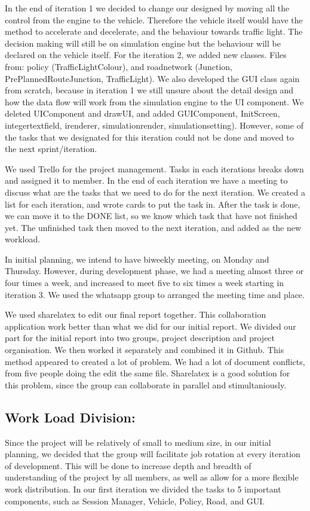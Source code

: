 \documentclass[11pt]{article}
\begin{document}
In the end of iteration 1 we decided to change our designed by moving all the control from the engine to the vehicle. Therefore the vehicle itself would have the method to accelerate and decelerate, and the behaviour towards traffic light. The decision making will still be on simulation engine but the behaviour will be declared on the vehicle itself. 
For the iteration 2, we added new classes. Files from: policy (TrafficLightColour), and roadnetwork (Junction, PrePlannedRouteJunction, TrafficLight). We also developed the GUI class again from scratch, because in iteration 1 we still unsure about the detail design and how the data flow will work from the simulation engine to the UI component. We deleted UIComponent and drawUI, and added GUIComponent, InitScreen, integertextfield, irenderer, simulationrender, simulationsetting). However, some of the tasks that we designated for this iteration could not be done and moved to the next sprint/iteration.  

We used Trello for the project management. Tasks in each iterations breaks down and assigned it to member. In the end of each iteration we have a meeting to discuss what are the tasks that we need to do for the next iteration. We created a list for each iteration, and wrote cards to put the task in. After the task is done, we can move it to the DONE list, so we know which task that have not finished yet. The unfinished task then moved to the next iteration, and added as the new workload.

In initial planning, we intend to have biweekly meeting, on Monday and Thursday. However, during development phase, we had a meeting almost three or four times a week, and increased to meet five to six times a week starting in iteration 3. We used the whatsapp group to arranged the meeting time and place. 

We used sharelatex to edit our final report together. This collaboration application work better than what we did for our initial report. We divided our part for the initial report into two groups, project description and project organisation. We then worked it separately and combined it in Github. This method appeared to created a lot of problem. We had a lot of document conflicts, from five people doing the edit the same file. Sharelatex is a good solution for this problem, since the group can collaborate in parallel and stimultaniously. 

\subsection{Work Load Division:}
Since the project will be relatively of small to medium size, in our initial planning, we decided that the group will facilitate job rotation at every iteration of development. This will be done to increase depth and breadth of understanding of the project by all members, as well as allow for a more flexible work distribution. In our first iteration we divided the tasks to 5 important components, such as Session Manager, Vehicle, Policy, Road, and GUI.
\end{document}

